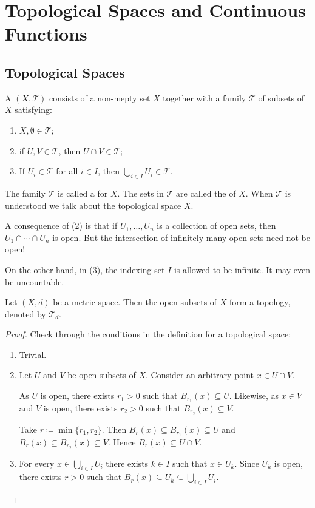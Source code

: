 \chapter{Topological Spaces and Continuous Functions}
\section{Topological Spaces}
\begin{definition}
A  $(X,\mathcal{T})$ consists of a non-mepty set $X$ together with a family $\mathcal{T}$ of subsets of $X$ satisfying:
\begin{enumerate}[label=(\arabic*)]
\item $X,\emptyset\in\mathcal{T}$;
\item if $U,V\in\mathcal{T}$, then $U\cap V\in\mathcal{T}$;
\item If $U_i\in\mathcal{T}$ for all $i\in I$, then $\bigcup_{i\in I}U_i\in\mathcal{T}$.
\end{enumerate}
The family $\mathcal{T}$ is called a  for $X$. The sets in $\mathcal{T}$ are called the  of $X$. When $\mathcal{T}$ is understood we talk about the topological space $X$.
\end{definition}

\begin{remark}
A consequence of (2) is that if $U_1,\dots,U_n$ is a collection of open sets, then $U_1\cap\cdots\cap U_n$ is open. But the intersection of infinitely many open sets need not be open!

On the other hand, in (3), the indexing set $I$ is allowed to be infinite. It may even be uncountable.
\end{remark}

\begin{proposition}\label{prop:topo-metrisable}
Let $(X,d)$ be a metric space. Then the open subsets of $X$ form a topology, denoted by $\mathcal{T}_d$.
\end{proposition}

\begin{proof}
Check through the conditions in the definition for a topological space:
\begin{enumerate}[label=(\arabic*)]
\item Trivial.
\item Let $U$ and $V$ be open subsets of $X$. Consider an arbitrary point $x\in U\cap V$.

As $U$ is open, there exists $r_1>0$ such that $B_{r_1}(x)\subseteq U$. Likewise, as $x\in V$ and $V$ is open, there exists $r_2>0$ such that $B_{r_2}(x)\subseteq V$.

Take $r\coloneqq\min\{r_1,r_2\}$. Then $B_r(x)\subseteq B_{r_1}(x)\subseteq U$ and $B_r(x)\subseteq B_{r_2}(x)\subseteq V$. Hence $B_r(x)\subseteq U\cap V$.

\item For every $x\in\bigcup_{i\in I}U_i$ there exists $k\in I$ such that $x\in U_k$. Since $U_k$ is open, there exists $r>0$ such that $B_r(x)\subseteq U_k\subseteq\bigcup_{i\in I}U_i$.
\end{enumerate}
\end{proof}

